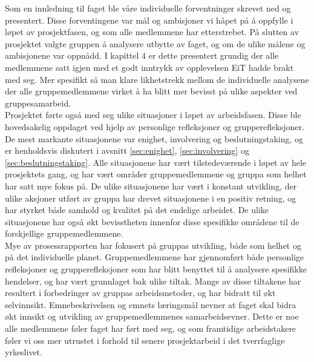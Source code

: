 
Som en innledning til faget ble våre individuelle forventninger skrevet ned og presentert. Disse forventingene var mål og ambisjoner vi håpet på å oppfylle i løpet av prosjektfasen, og som alle medlemmene har etterstrebet. På slutten av prosjektet valgte gruppen å analysere utbytte av faget, og om de ulike målene og ambisjonene var oppnådd. I kapittel 4 er dette presentert grundig der alle medlemmene satt igjen med et godt inntrykk av opplevelsen EiT hadde brakt med seg. Mer spesifikt så man klare likhetstrekk mellom de individuelle analysene der alle gruppemedlemmene virket å ha blitt mer bevisst på ulike aspekter ved gruppesamarbeid.\\

Prosjektet førte også med seg ulike situasjoner i løpet av arbeidsfasen. Disse ble hovedsakelig oppdaget ved hjelp av personlige refleksjoner og grupperefleksjoner. De mest markante situasjonene var enighet, involvering og beslutningstaking, og er henholdsvis diskutert i avsnitt \ref{sec:enighet},  \ref{sec:involvering} og  \ref{sec:beslutningstaking}. Alle situasjonene har vært tilstedeværende i løpet av hele prosjektets gang, og har vært områder gruppemedlemmene og gruppa som helhet har satt mye fokus på. De ulike situasjonene har vært i konstant utvikling, der ulike aksjoner utført av gruppa har drevet situasjonene i en positiv retning, og har styrket både samhold og kvalitet på det endelige arbeidet. De ulike situasjonene har også økt bevisstheten innenfor disse spesifikke områdene til de forskjellige gruppemedlemmene.\\

Mye av prosessrapporten har fokusert på gruppas utvikling, både som helhet og på det individuelle planet. Gruppemedlemmene har gjennomført både personlige refleksjoner og grupperefleksjoner som har blitt benyttet til å analysere spesifikke hendelser, og har vært grunnlaget bak ulike tiltak. Mange av disse tiltakene har resultert i forbedringer av gruppas arbeidsmetoder, og har bidratt til økt selvinnsikt. Emnebeskrivelsen og emnets læringsmål nevner at faget skal bidra økt innsikt og utvikling av gruppemedlemmenes samarbeidsevner. Dette er noe alle medlemmene føler faget har ført med seg, og som framtidige arbeidstakere føler vi oss mer utrustet i forhold til senere prosjektarbeid i det tverrfaglige yrkeslivet.

